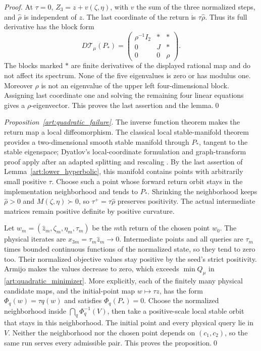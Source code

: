 \begin{proof}
At $\tau=0$, $Z_3=z+v(\zeta,\eta)$, with $v$ the sum of the three normalized steps, and $\hat\rho$ is independent of $z$.
The last coordinate of the return is $\tau\hat\rho$. Thus its full derivative
has the block form
\[
 D\mathcal T_\mu(P_*)=
 \begin{pmatrix}
 \rho^{-1}I_2&*&*\\0&J&*\\0&0&\rho
 \end{pmatrix}.
\]
The blocks marked $*$ are finite derivatives of the displayed rational
map and do not affect its spectrum. None of the five eigenvalues is zero
or has modulus one. Moreover $\rho$ is not an eigenvalue of the upper
left four-dimensional block. Assigning last coordinate one and solving
the remaining four linear equations gives a $\rho$-eigenvector. This
proves the last assertion and the lemma.\qed
\end{proof}

\begin{proof}[Proposition~\ref{art:quadratic_failure}]
The inverse function theorem makes the return map a local diffeomorphism.
The classical local stable-manifold theorem provides a two-dimensional
smooth stable manifold through $P_*$, tangent to the stable eigenspace;
Dyatlov's local-coordinate formulation and graph-transform proof apply
after an adapted splitting and rescaling
.
By the last assertion of
Lemma~\ref{art:lower_hyperbolic}, this manifold contains points with
arbitrarily small positive $\tau$.
Choose such a point whose forward return orbit stays in the implementation
neighborhood and tends to $P_*$. Shrinking the neighborhood keeps $\hat\rho>0$
and $M(\zeta,\eta)\succ0$, so $\tau^+=\tau\hat\rho$ preserves positivity. The actual
intermediate matrices remain positive definite by positive curvature.

Let $w_m=(\hat z_m,\zeta_m,\eta_m,\tau_m)$ be the $m$th return of the chosen
point $w_0$. The physical iterates are $x_{3m}=\tau_m\hat z_m\to0$. Intermediate points
and all queries are $\tau_m$ times bounded continuous functions of the
normalized state, so they tend to zero too. Their normalized objective
values stay positive by the seed's strict positivity. Armijo makes the
values decrease to zero, which exceeds $\min Q_\mu$ in
\eqref{art:quadratic_minimizer}.
More explicitly, each of the finitely many physical candidate maps, and the
initial-point map $w\mapsto\tau z$, has
the form $\Phi_q(w)=\tau q(w)$ and satisfies $\Phi_q(P_*)=0$.
Choose the normalized neighborhood inside
$\bigcap_q\Phi_q^{-1}(V)$, then take a positive-scale local stable orbit
that stays in this neighborhood. The initial point and every physical query lie in $V$.
Neither the neighborhood nor the chosen point depends on $(c_1,c_2)$, so
the same run serves every admissible pair. This proves the proposition.\qed
\end{proof}

